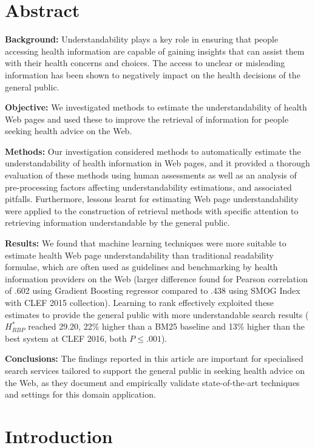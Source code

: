\documentclass[10pt,a4paper]{article}
\begin{document}
	

\section*{Abstract}
\textbf{Background:} Understandability plays a key role in ensuring that people accessing health information are capable of gaining insights that can assist them with their health concerns and choices. The access to unclear or misleading information has been shown to negatively impact on the health decisions of the general public.

\textbf{Objective:} We investigated methods to estimate the understandability of health Web pages and used these to improve the retrieval of information for people seeking health advice on the Web.

\textbf{Methods:} Our investigation considered methods to automatically estimate the understandability of health information in Web pages, and it provided a thorough evaluation of these methods using human assessments as well as an analysis of pre-processing factors affecting understandability estimations, and associated pitfalls. Furthermore, lessons learnt for estimating Web page understandability were applied to the construction of retrieval methods with specific attention to retrieving information understandable by the general public.

\textbf{Results:} We found that machine learning techniques were more suitable to estimate health Web page understandability than traditional readability formulae, which are often used as guidelines and benchmarking by health information providers on the Web (larger difference found for Pearson correlation of .602 using Gradient Boosting regressor compared to .438 using SMOG Index with CLEF 2015 collection). 
Learning to rank effectively exploited these estimates to provide the general public with more understandable search results ($H^*_{RBP}$ reached 29.20, 22\% higher than a BM25 baseline and 13\% higher than the best system at CLEF 2016, both $P \le .001$).

\textbf{Conclusions:} The findings reported in this article are important for specialised search services tailored to support the general public in seeking health advice on the Web, as they document and empirically validate state-of-the-art techniques and settings for this domain application.


\section*{Introduction} 
\label{chp:understanding_understandability}
\end{document}
